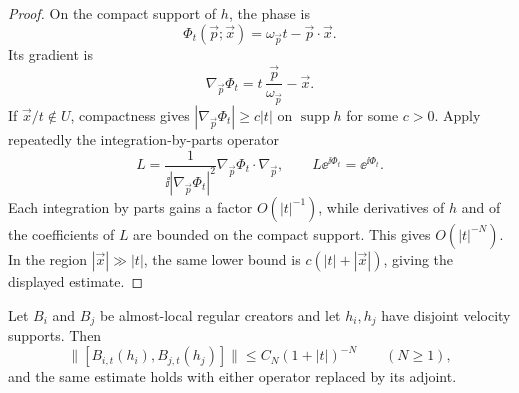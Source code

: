 \begin{proof}
On the compact support of \(h\), the phase is
\[
  \Phi_t(\vec p;\vec x)
  =
  \omega_{\vec p}t-\vec p\cdot\vec x .
\]
Its gradient is
\[
  \nabla_{\vec p}\Phi_t
  =
  t\,\frac{\vec p}{\omega_{\vec p}}-\vec x .
\]
If \(\vec x/t\notin U\), compactness gives
\(|\nabla_{\vec p}\Phi_t|\ge c|t|\) on \(\operatorname{supp}h\) for some
\(c>0\).  Apply repeatedly the integration-by-parts operator
\[
  L
  =
  \frac{1}{\ii|\nabla_{\vec p}\Phi_t|^2}
  \nabla_{\vec p}\Phi_t\cdot\nabla_{\vec p},
  \qquad
  L\ee^{\ii\Phi_t}=\ee^{\ii\Phi_t}.
\]
Each integration by parts gains a factor \(O(|t|^{-1})\), while derivatives
of \(h\) and of the coefficients of \(L\) are bounded on the compact support.
This gives \(O(|t|^{-N})\).  In the region \(|\vec x|\gg |t|\), the same
lower bound is \(c(|t|+|\vec x|)\), giving the displayed estimate.
\end{proof}

\begin{proposition}
\label{prop:almost-locality-gives-hr-commutator}
Let \(B_i\) and \(B_j\) be almost-local regular creators and let
\(h_i,h_j\) have disjoint velocity supports.  Then
\[
  \|[B_{i,t}(h_i),B_{j,t}(h_j)]\|
  \le C_N(1+|t|)^{-N}
  \qquad (N\ge1),
\]
and the same estimate holds with either operator replaced by its adjoint.
\end{proposition}

